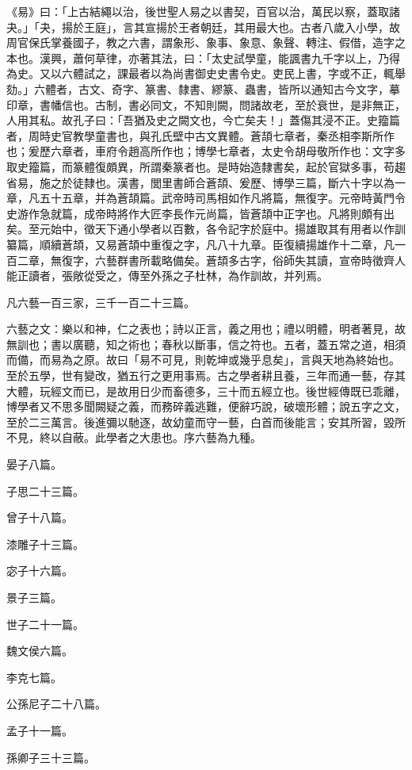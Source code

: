 \begin{pinyinscope}
《易》曰：「上古結繩以治，後世聖人易之以書契，百官以治，萬民以察，蓋取諸夬。」「夬，揚於王庭」，言其宣揚於王者朝廷，其用最大也。古者八歲入小學，故周官保氏掌養國子，教之六書，謂象形、象事、象意、象聲、轉注、假借，造字之本也。漢興，蕭何草律，亦著其法，曰：「太史試學童，能諷書九千字以上，乃得為史。又以六體試之，課最者以為尚書御史史書令史。吏民上書，字或不正，輒舉劾。」六體者，古文、奇字、篆書、隸書、繆篆、蟲書，皆所以通知古今文字，摹印章，書幡信也。古制，書必同文，不知則闕，問諸故老，至於衰世，是非無正，人用其私。故孔子曰：「吾猶及史之闕文也，今亡矣夫！」蓋傷其浸不正。史籀篇者，周時史官教學童書也，與孔氏壁中古文異體。蒼頡七章者，秦丞相李斯所作也；爰歷六章者，車府令趙高所作也；博學七章者，太史令胡母敬所作也：文字多取史籀篇，而篆體復頗異，所謂秦篆者也。是時始造隸書矣，起於官獄多事，苟趨省易，施之於徒隸也。漢書，閭里書師合蒼頡、爰歷、博學三篇，斷六十字以為一章，凡五十五章，并為蒼頡篇。武帝時司馬相如作凡將篇，無復字。元帝時黃門令史游作急就篇，成帝時將作大匠李長作元尚篇，皆蒼頡中正字也。凡將則頗有出矣。至元始中，徵天下通小學者以百數，各令記字於庭中。揚雄取其有用者以作訓纂篇，順續蒼頡，又易蒼頡中重復之字，凡八十九章。臣復續揚雄作十二章，凡一百二章，無復字，六藝群書所載略備矣。蒼頡多古字，俗師失其讀，宣帝時徵齊人能正讀者，張敞從受之，傳至外孫之子杜林，為作訓故，并列焉。

凡六藝一百三家，三千一百二十三篇。

六藝之文：樂以和神，仁之表也；詩以正言，義之用也；禮以明體，明者著見，故無訓也；書以廣聽，知之術也；春秋以斷事，信之符也。五者，蓋五常之道，相須而備，而易為之原。故曰「易不可見，則乾坤或幾乎息矣」，言與天地為終始也。至於五學，世有變改，猶五行之更用事焉。古之學者耕且養，三年而通一藝，存其大體，玩經文而已，是故用日少而畜德多，三十而五經立也。後世經傳既已乖離，博學者又不思多聞闕疑之義，而務碎義逃難，便辭巧說，破壞形體；說五字之文，至於二三萬言。後進彌以馳逐，故幼童而守一藝，白首而後能言；安其所習，毀所不見，終以自蔽。此學者之大患也。序六藝為九種。

晏子八篇。

子思二十三篇。

曾子十八篇。

漆雕子十三篇。

宓子十六篇。

景子三篇。

世子二十一篇。

魏文侯六篇。

李克七篇。

公孫尼子二十八篇。

孟子十一篇。

孫卿子三十三篇。


\end{pinyinscope}
